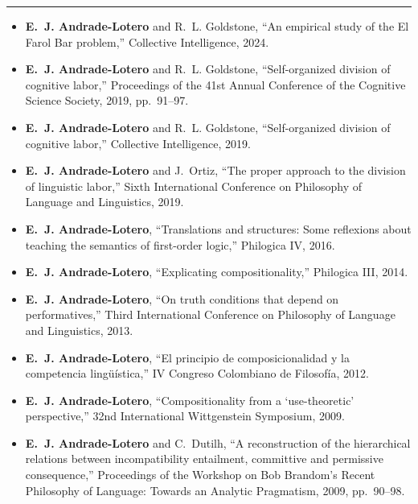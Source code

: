 \documentclass[10pt]{article}
\newcommand{\cvsection}[1]{%
  \par\vspace{0.55em}%
  \noindent{\sffamily\bfseries\MakeUppercase{#1}}\par
  \vspace{-0.35em}%
  \noindent\rule{\textwidth}{0.4pt}\par
  \vspace{0.2em}%
}
\begin{document}
\cvsection{Publications: Conference Papers}
\begin{itemize}
  \item \textbf{E.~J. Andrade-Lotero} and R.~L. Goldstone, ``An empirical study of the El Farol Bar problem,'' {Collective Intelligence}, 2024.
  \item \textbf{E.~J. Andrade-Lotero} and R.~L. Goldstone, ``Self-organized division of cognitive labor,'' {Proceedings of the 41st Annual Conference of the Cognitive Science Society}, 2019, pp.~91--97.
  \item \textbf{E.~J. Andrade-Lotero} and R.~L. Goldstone, ``Self-organized division of cognitive labor,'' {Collective Intelligence}, 2019.
  \item \textbf{E.~J. Andrade-Lotero} and J.~Ortiz, ``The proper approach to the division of linguistic labor,'' {Sixth International Conference on Philosophy of Language and Linguistics}, 2019.
  \item \textbf{E.~J. Andrade-Lotero}, ``Translations and structures: Some reflexions about teaching the semantics of first-order logic,'' {Philogica IV}, 2016.
  \item \textbf{E.~J. Andrade-Lotero}, ``Explicating compositionality,'' {Philogica III}, 2014.
  \item \textbf{E.~J. Andrade-Lotero}, ``On truth conditions that depend on performatives,'' {Third International Conference on Philosophy of Language and Linguistics}, 2013.
  \item \textbf{E.~J. Andrade-Lotero}, ``El principio de composicionalidad y la competencia ling\"u\'istica,'' {IV Congreso Colombiano de Filosof\'ia}, 2012.
  \item \textbf{E.~J. Andrade-Lotero}, ``Compositionality from a `use-theoretic' perspective,'' {32nd International Wittgenstein Symposium}, 2009.
  \item \textbf{E.~J. Andrade-Lotero} and C.~Dutilh, ``A reconstruction of the hierarchical relations between incompatibility entailment, committive and permissive consequence,'' {Proceedings of the Workshop on Bob Brandom's Recent Philosophy of Language: Towards an Analytic Pragmatism}, 2009, pp.~90--98.
\end{itemize}
\end{document}

